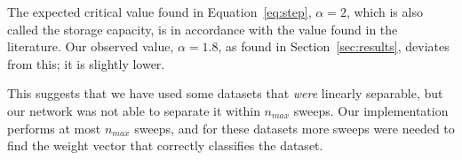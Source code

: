  The expected critical value found in Equation~\ref{eq:step}, \(\alpha=2\), which is also called the storage capacity, is in accordance with the value found in the literature\cite{perceptron_slides2}.
 Our observed value, \(\alpha = 1.8\), as found in Section~\ref{sec:results}, deviates from this; it is slightly lower.
 
 This suggests that we have used some datasets that \emph{were} linearly separable, but our network was not able to separate it within \(n_{max}\) sweeps.
 Our implementation performs at most \(n_{max}\) sweeps, and for these datasets more sweeps were needed to find the weight vector that correctly classifies the dataset.
